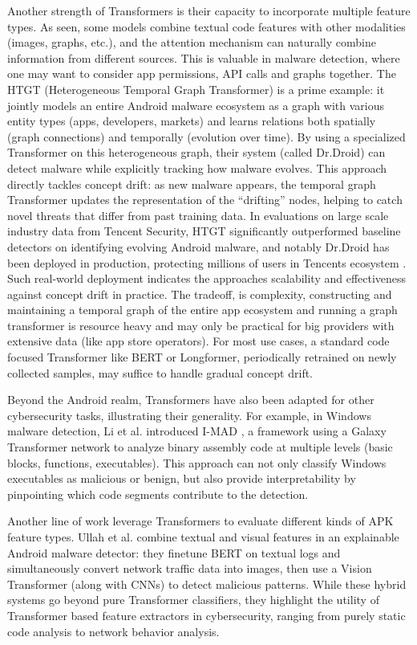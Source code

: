 Another strength of Transformers is their capacity to incorporate multiple feature types. 
As seen, some models combine textual code features with other modalities (images, graphs, etc.), 
and the attention mechanism can naturally combine information from different sources. 
This is valuable in malware detection, where one may want to consider app permissions, 
API calls and graphs together. 
The HTGT (Heterogeneous Temporal Graph Transformer) 
\cite{htgt}
is a prime example: 
it jointly models an entire Android malware ecosystem as a graph with various entity types 
(apps, developers, markets) and learns relations both spatially (graph connections) and temporally 
(evolution over time). 
By using a specialized Transformer on this heterogeneous graph, 
their system (called Dr.Droid) can detect malware while explicitly tracking how malware 
evolves. 
This approach directly tackles concept drift: as new malware appears, 
the temporal graph Transformer updates the representation of the “drifting” nodes, 
helping to catch novel threats that differ from past training data. 
In evaluations on large scale industry data from Tencent Security, 
HTGT significantly outperformed baseline detectors on identifying evolving Android malware, 
and notably Dr.Droid has been deployed in production, protecting millions of users in Tencents ecosystem
\cite{htgt}
. Such real-world deployment indicates the approaches scalability and effectiveness against concept drift 
in practice. 
The tradeoff, is complexity, constructing and maintaining a temporal graph of the entire app 
ecosystem and running a graph transformer is resource heavy and may only be practical for big providers 
with extensive data (like app store operators). 
For most use cases, a standard code focused Transformer like BERT or Longformer, 
periodically retrained on newly collected samples, may suffice to handle gradual concept drift. 

Beyond the Android realm, Transformers have also been adapted for other cybersecurity tasks, 
illustrating their generality. 
For example, in Windows malware detection, Li et al. introduced I-MAD
\cite{imad}
, a framework using a Galaxy Transformer network to analyze binary assembly code at multiple levels 
(basic blocks, functions, executables). 
This approach can not only classify Windows executables as malicious or benign, 
but also provide interpretability by pinpointing which code segments contribute to the detection. 

Another line of work leverage Transformers to evaluate different kinds of APK feature types. 
Ullah et al. 
\cite{vision_language_transformer} 
combine textual and visual features in an explainable Android malware detector: 
they finetune BERT on textual logs and simultaneously convert network traffic data into images, 
then use a Vision Transformer (along with CNNs) to detect malicious patterns. 
While these hybrid systems go beyond pure Transformer classifiers, 
they highlight the utility of Transformer based feature extractors in cybersecurity, 
ranging from purely static code analysis to network behavior analysis. 

